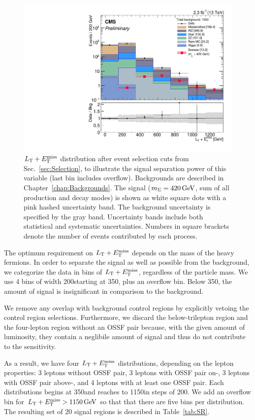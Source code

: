 \begin{figure}
\begin{center}
	\includegraphics[width=.7\textwidth]{Strategy/LT+MET}
	\caption{$L_\textrm{T} + E_{\mathrm{T}}^{\text{miss}}$ distribution after event selection cuts from Sec.~\ref{sec:Selection}, to illustrate the signal separation power of this variable (last bin includes overflow). Backgrounds are described in Chapter~{\ref{chap:Backgrounds}}. The signal ($m_\Sigma = 420\,\text{Ge\hspace{-.08em}V}$, sum of all production and decay modes) is shown as white square dots with a pink hashed uncertainty band. The background uncertainty is specified by the gray band. Uncertainty bands include both statistical and systematic uncertainties. Numbers in square brackets denote the number of events contributed by each process.
	\label{fig:Optimization}}
\end{center}
\end{figure}

The optimum requirement on $L_\textrm{T} + E_{\mathrm{T}}^{\text{miss}}$ depends on the mass of the heavy fermions. In order to separate the signal as well as possible from the background, we categorize the data in bins of $L_\textrm{T} + E_{\mathrm{T}}^{\text{miss}}$, regardless of the particle mass. We use 4 bins of width 200\GeV starting at 350\GeV, plus an overflow bin. Below 350\GeV, the amount of signal is insignificant in comparison to the background.

We remove any overlap with background control regions by explicitly vetoing the control region selections. Furthermore, we discard the below-\Z trilepton region and the four-lepton region without an OSSF pair because, with the given amount of luminosity, they contain a neglibile amount of signal and thus do not contribute to the sensitivity.

As a result, we have four $L_\textrm{T} + E_{\mathrm{T}}^{\text{miss}}$ distributions, depending on the lepton properties: 3 leptons without OSSF pair, 3 leptons with OSSF pair on-\Z, 3 leptons with OSSF pair above-\Z, and 4 leptons with at least one OSSF pair. Each distributions begins at 350\GeV and reaches to 1150\GeV in steps of 200\GeV. We add an overflow bin for $L_\textrm{T} + E_{\mathrm{T}}^{\text{miss}} > 1150\,\text{Ge\hspace{-.08em}V}$ so that that there are five bins per distribution. The resulting set of 20 signal regions is described in Table~\ref{tab:SR}.

